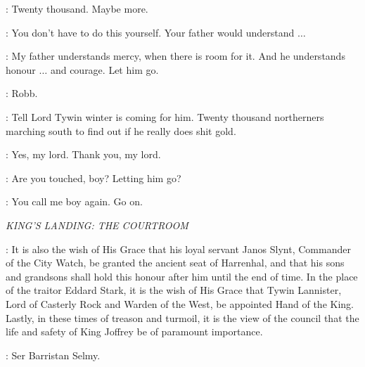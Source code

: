 \SPY: Twenty thousand. Maybe more. 

\RODRIK: You don't have to do this yourself. Your father would understand $\ldots$  

\ROBB: My father understands mercy, when there is room for it. And he understands honour $\ldots$ and courage. Let him go. 

\CATELYN: Robb. 

\ROBB: Tell Lord Tywin winter is coming for him. Twenty thousand northerners marching south to find out if he really does shit gold. 

\SPY: Yes, my lord. Thank you, my lord. 


\UMBER: Are you touched, boy? Letting him go? 

\ROBB: You call me boy again. Go on. 



\scene

\textit{KING'S LANDING: THE COURTROOM}


\PYCELLE: It is also the wish of His Grace that his loyal servant Janos Slynt, Commander of the City Watch, be granted the ancient seat of Harrenhal, and that his sons and grandsons shall hold this honour after him until the end of time.  In the place of the traitor Eddard Stark, it is the wish of His Grace that Tywin Lannister, Lord of Casterly Rock and Warden of the West, be appointed Hand of the King. Lastly, in these times of treason and turmoil, it is the view of the council that the life and safety of King Joffrey be of paramount importance. 

\CERSEI:  Ser Barristan Selmy. 


